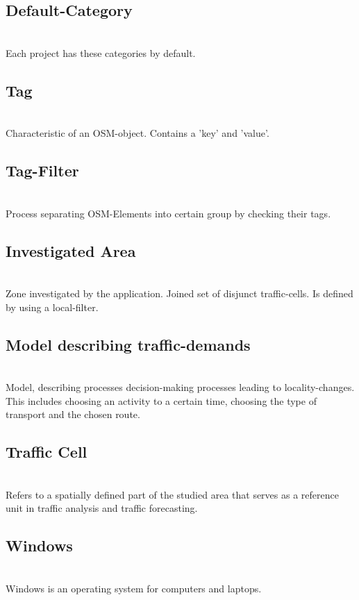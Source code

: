 \documentclass[parskip=full]{scrartcl} %
\begin{document}
\subsection{Default-Category}\\
Each project has these categories by default.

\subsection{Tag}\\
Characteristic of an OSM-object. Contains a 'key' and 'value'.

\subsection{Tag-Filter}\\
Process separating OSM-Elements into certain group by checking their tags.

\subsection{Investigated Area}\\
Zone investigated by the application. Joined set of disjunct traffic-cells. Is defined by using a local-filter.

\subsection{Model describing traffic-demands}\\
Model, describing processes decision-making processes leading to locality-changes. This includes choosing an activity to a certain time, choosing the type of transport and the chosen route.

\subsection*{Traffic Cell}\\
Refers to a spatially defined part of the studied area that serves as a reference unit in traffic analysis and traffic forecasting.

\subsection*{Windows}\\
Windows is an operating system for computers and laptops.
\end{document}

